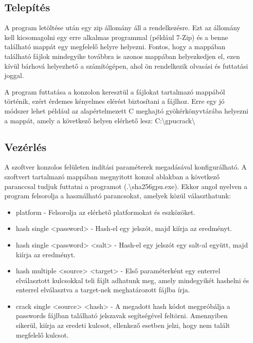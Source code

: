 \subsection{Telepítés}

A program letöltése után egy zip állomány áll a rendelkezésre. Ezt az állomány kell kicsomagolni egy erre alkalmas programmal (például 7-Zip) és a benne található mappát egy megfelelő helyre helyezni. Fontos, hogy a mappában található fájlok mindegyike továbbra is azonos mappában helyezkedjen el, ezen kívül bárhová helyezhető a számítógépen, ahol ön rendelkezik olvasási és futtatási joggal.

A program futtatása a konzolon keresztül a fájlokat tartalmazó mappából történik, ezért érdemes kényelmes elérést biztosítani a fájlhoz. Erre egy jó módszer lehet például az alapértelmezett C meghajtó gyökérkönyvtárába helyezni a mappát, amely a következő helyen elérhető lesz: C:\textbackslash gpucrack\textbackslash



\subsection{Vezérlés}

A szoftver konzolos felületen indítási paraméterek megadásával konfigurálható. A szoftvert tartalmazó mappában megnyitott konzol ablakban a következő paranccsal tudjuk futtatni a programot (.\textbackslash sha256gpu.exe). Ekkor angol nyelven a program felsorolja a használható parancsokat, amelyek közül választhatunk:
%
\begin{itemize}
    \item platform - Felsorolja az elérhető platformokat és eszközöket.
    \item hash single <password> - Hash-el egy jelszót, majd kiírja az eredményt.
    \item hash single <password> <salt> - Hash-el egy jelszót egy salt-al együtt, majd kiírja az eredményt.
    \item hash multiple <source> <target> - Első paraméterként egy enterrel elválasztott kulcsokkal teli fájlt adhatunk meg, amely mindegyikét hashelni és enterrel elválasztva a target-nek meghatározott fájlba írja.
    \item crack single <source> <hash> - A megadott hash kódot megpróbálja a passwords fájlban található jelszavak segítségével feltörni. Amennyiben sikerül, kiírja az eredeti kulcsot, ellenkező esetben jelzi, hogy nem talált megfelelő kulcsot.
\end{itemize}

